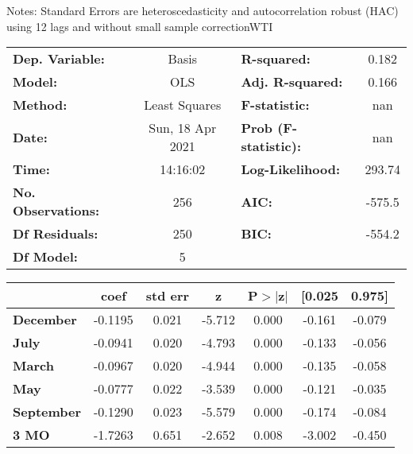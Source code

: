 Notes: \newline
 [1] Standard Errors are heteroscedasticity and autocorrelation robust (HAC) using 12 lags and without small sample correctionWTI\begin{center}
\begin{tabular}{lclc}
\toprule
\textbf{Dep. Variable:}    &      Basis       & \textbf{  R-squared:         } &     0.182   \\
\textbf{Model:}            &       OLS        & \textbf{  Adj. R-squared:    } &     0.166   \\
\textbf{Method:}           &  Least Squares   & \textbf{  F-statistic:       } &       nan   \\
\textbf{Date:}             & Sun, 18 Apr 2021 & \textbf{  Prob (F-statistic):} &      nan    \\
\textbf{Time:}             &     14:16:02     & \textbf{  Log-Likelihood:    } &    293.74   \\
\textbf{No. Observations:} &         256      & \textbf{  AIC:               } &    -575.5   \\
\textbf{Df Residuals:}     &         250      & \textbf{  BIC:               } &    -554.2   \\
\textbf{Df Model:}         &           5      & \textbf{                     } &             \\
\bottomrule
\end{tabular}
\begin{tabular}{lcccccc}
                   & \textbf{coef} & \textbf{std err} & \textbf{z} & \textbf{P$> |$z$|$} & \textbf{[0.025} & \textbf{0.975]}  \\
\midrule
\textbf{December}  &      -0.1195  &        0.021     &    -5.712  &         0.000        &       -0.161    &       -0.079     \\
\textbf{July}      &      -0.0941  &        0.020     &    -4.793  &         0.000        &       -0.133    &       -0.056     \\
\textbf{March}     &      -0.0967  &        0.020     &    -4.944  &         0.000        &       -0.135    &       -0.058     \\
\textbf{May}       &      -0.0777  &        0.022     &    -3.539  &         0.000        &       -0.121    &       -0.035     \\
\textbf{September} &      -0.1290  &        0.023     &    -5.579  &         0.000        &       -0.174    &       -0.084     \\
\textbf{3 MO}      &      -1.7263  &        0.651     &    -2.652  &         0.008        &       -3.002    &       -0.450     \\

\end{tabular}
\end{center}

